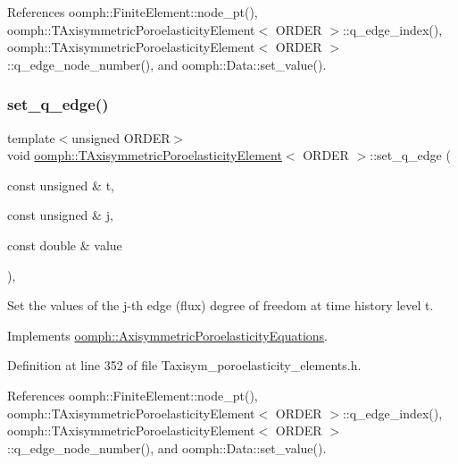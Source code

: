 References oomph\+::\+Finite\+Element\+::node\+\_\+pt(), oomph\+::\+T\+Axisymmetric\+Poroelasticity\+Element$<$ O\+R\+D\+E\+R $>$\+::q\+\_\+edge\+\_\+index(), oomph\+::\+T\+Axisymmetric\+Poroelasticity\+Element$<$ O\+R\+D\+E\+R $>$\+::q\+\_\+edge\+\_\+node\+\_\+number(), and oomph\+::\+Data\+::set\+\_\+value().

\mbox{\label{classoomph_1_1TAxisymmetricPoroelasticityElement_aa6aa64af2580183c4e81a1466c6e467f}} 
\subsubsection{\texorpdfstring{set\+\_\+q\+\_\+edge()}{set\_q\_edge()}\hspace{0.1cm}{\footnotesize\ttfamily [2/2]}}
{\footnotesize\ttfamily template$<$unsigned O\+R\+D\+ER$>$ \\
void \hyperlink{classoomph_1_1TAxisymmetricPoroelasticityElement}{oomph\+::\+T\+Axisymmetric\+Poroelasticity\+Element}$<$ O\+R\+D\+ER $>$\+::set\+\_\+q\+\_\+edge (\begin{DoxyParamCaption}\item[{const unsigned \&}]{t,  }\item[{const unsigned \&}]{j,  }\item[{const double \&}]{value }\end{DoxyParamCaption})\hspace{0.3cm}{\ttfamily [inline]}, {\ttfamily [virtual]}}



Set the values of the j-\/th edge (flux) degree of freedom at time history level t. 



Implements \hyperlink{classoomph_1_1AxisymmetricPoroelasticityEquations_a30a9883e688ff91b78407b2e42e92d95}{oomph\+::\+Axisymmetric\+Poroelasticity\+Equations}.



Definition at line 352 of file Taxisym\+\_\+poroelasticity\+\_\+elements.\+h.



References oomph\+::\+Finite\+Element\+::node\+\_\+pt(), oomph\+::\+T\+Axisymmetric\+Poroelasticity\+Element$<$ O\+R\+D\+E\+R $>$\+::q\+\_\+edge\+\_\+index(), oomph\+::\+T\+Axisymmetric\+Poroelasticity\+Element$<$ O\+R\+D\+E\+R $>$\+::q\+\_\+edge\+\_\+node\+\_\+number(), and oomph\+::\+Data\+::set\+\_\+value().

